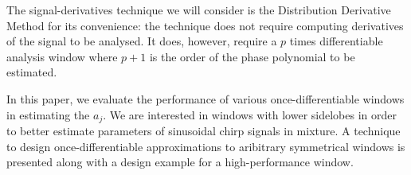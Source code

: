 \documentclass[twoside,a4paper]{article}
\begin{document}
The signal-derivatives technique we will consider is the
Distribution Derivative Method for its convenience: the technique does not
require computing derivatives of the signal to be analysed. It does, however, require a
$p$ times differentiable analysis window where $p+1$ is the order of the
phase polynomial to be estimated. 

In this paper, we evaluate the performance of various once-differentiable
windows in estimating the $a_{j}$. We are interested in windows with lower
sidelobes in order to better estimate parameters of sinusoidal chirp signals in
mixture. A technique to design once-differentiable approximations to aribitrary
symmetrical windows is presented along with a design example for a
high-performance window.

%
%
\end{document}
